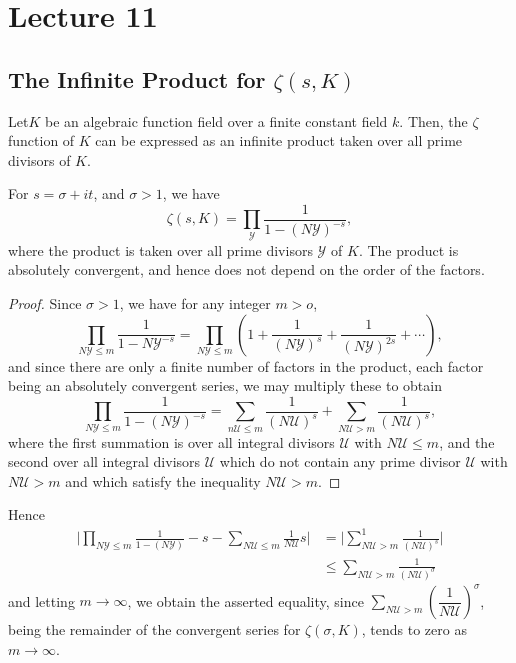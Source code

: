 \chapter{Lecture 11}\label{chap11} %

\setcounter{section}{21}
\section{The Infinite Product for \texorpdfstring{$\zeta (s,K)$}{zetasK}}\label{chap11:sec:22} %

Let\pageoriginale $K$ be an algebraic function field over a finite constant field
$k$. Then, the $\zeta$ function of $K$ can be expressed as an infinite
product taken over all prime divisors of $K$. 
\begin{theorem*}
  For $s = \sigma + i t$, and $\sigma > 1$, we have
  $$
  \zeta (s,K) = \prod_\mathscr{Y} \frac{1}{1-(N \mathscr{Y})^{-s}},
  $$
  where the product is taken over all prime divisors $\mathscr{Y}$ of
  $K$. The product is absolutely convergent, and hence does not depend
  on the order of the factors. 
\end{theorem*}

\begin{proof}
  Since $\sigma > 1$, we have for any integer $m>o$,
  $$
  \prod_{N \mathscr{Y} \le m} \frac{1}{1-N \mathscr{Y}^{-s}} =\prod_{ N
    \mathscr{Y} \le m} \left(1+ \frac{1}{(N \mathscr{Y})^{s}} +
  \frac{1}{(N \mathscr{Y})^{2s}} + \cdots\right), 
  $$
  and since there are only a finite number of factors in the product, 
  each factor being an absolutely convergent series, we may multiply these 
  to obtain  
  $$
  \prod_{N \mathscr{Y} \le m} \frac{1}{1-(N \mathscr{Y})^{-s}} =
  \sum_{n \mathscr{U} \le m} \frac{1}{(N \mathscr{U})^s} + \sum_{N
    \mathscr{U}> m} \frac{1}{(N \mathscr{U})^s},
  $$
  where the first 
  summation is over all integral divisors $\mathscr{U}$ with $N
  \mathscr{U} \le m$, and the second over all integral divisors
  $\mathscr{U}$ which do not contain any prime divisor $\mathscr{U}$
  with $N \mathscr{U} >m$ and which satisfy the inequality $N
  \mathscr{U} > m$. 
\end{proof}

Hence\pageoriginale\
\begin{align*}
  \bigg|  \prod_{N \mathscr{Y} \le m} \frac{1}{1-(N \mathscr{Y})} -s -
  \sum _{N \mathscr{U} \le m} \frac{1}{N \mathscr{U}} s \bigg| & = \bigg|
  \sum^1_{N \mathscr{U} > m} \frac{1}{(N \mathscr{U})^s} \bigg|\\ 
  & \le \sum_{ N \mathscr{U} > m} \frac{1}{(N \mathscr{U})^\sigma} 
\end{align*}
and letting $m \to \infty$, we obtain the asserted equality, since
$\sum\limits_{N \mathscr{U} > m} (\dfrac{1}{ N \mathscr{U}})^\sigma$,
being the remainder of the convergent series for $\zeta (\sigma, K)$,
tends to zero as $m \to \infty$. 


